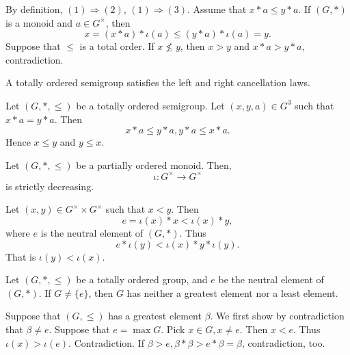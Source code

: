 \begin{proofenv}
    By definition, $(1)\Rightarrow (2)$, $(1)\Rightarrow (3)$. Assume that $x*a\le y*a$. If $(G,*)$ is a monoid and $a\in G^\times$, then 
    $$x=(x*a)*\iota(a)\le (y*a)*\iota(a)=y.$$
    Suppose that $\le $ is a total order. If $x\not\le y$, then $x>y$ and $x*a>y*a$, contradiction.
\end{proofenv}
\begin{corollaryenv}
    A totally ordered semigroup satisfies the left and right cancellation laws.
\end{corollaryenv}
\begin{proofenv}
    Let $(G,*,\le)$ be a totally ordered semigroup. Let $(x,y,a)\in G^3$ such that $x*a=y*a$. Then 
    $$x*a\le y*a, y*a\le x*a.$$
    Hence $x\le y$ and $y\le x$.
\end{proofenv}
\begin{propositionenv}
    Let $(G,*,\le)$ be a partially ordered monoid. Then,
    $$\iota:G^\times\longrightarrow G^\times $$
    is strictly decreasing.
\end{propositionenv}
\begin{proofenv}
    Let $(x,y)\in G^\times\times G^\times$ such that $x< y$. Then 
    $$e=\iota(x)*x<\iota(x)*y,$$
    where $e$ is the neutral element of $(G,*)$. Thus 
    $$e*\iota(y)<\iota(x)*y*\iota(y).$$
    That is $\iota(y)<\iota(x)$.
\end{proofenv}
\begin{propositionenv}
    Let $(G,*,\le)$ be a totally ordered group, and $e$ be the neutral element of $(G,*)$. If $G\not=\{e\}$, then $G$ has neither a greatest element nor a least element.
\end{propositionenv}
\begin{proofenv}
    Suppose that $(G,\le)$ has a greatest element $\beta$. We first show by contradiction that $\beta\not=e$. Suppose that $e=\max G$. Pick $x\in G,x\not= e$. Then $x<e$. Thus $\iota (x)>\iota(e)$. Contradiction. If $\beta>e, \beta*\beta>e*\beta=\beta$, contradiction, too.
\end{proofenv}



